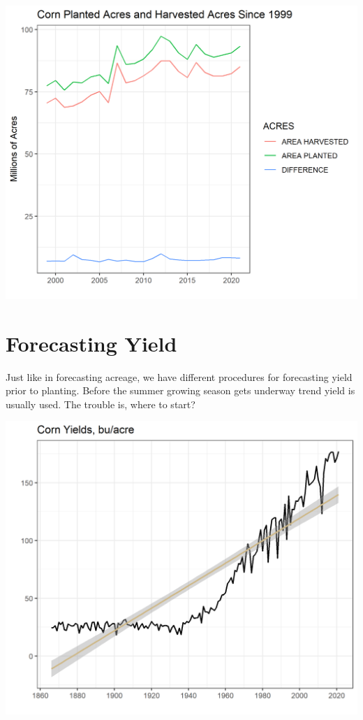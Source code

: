 \documentclass[
]{book}
\begin{document}
\includegraphics{assets/ForecastingProduction-PAHA.png}

\hypertarget{forecasting-yield}{%
\section{Forecasting Yield}\label{forecasting-yield}}

Just like in forecasting acreage, we have different procedures for forecasting yield prior to planting. Before the summer growing season gets underway trend yield is usually used. The trouble is, where to start?

\includegraphics{assets/ForecastProduction-yieldsall.png}
\end{document}
